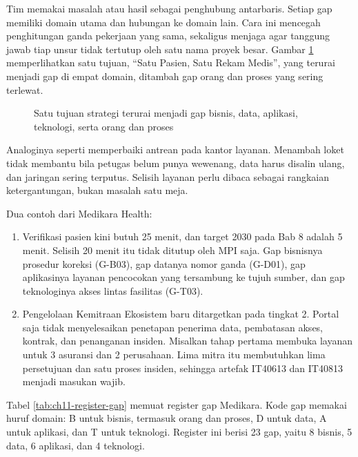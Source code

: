 Tim memakai masalah atau hasil sebagai penghubung antarbaris. Setiap gap memiliki domain
utama dan hubungan ke domain lain. Cara ini mencegah penghitungan ganda pekerjaan yang
sama, sekaligus menjaga agar tanggung jawab tiap unsur tidak tertutup oleh satu nama
proyek besar. Gambar \ref{fig:ch11-gap-lintas-domain} memperlihatkan satu tujuan,
``Satu Pasien, Satu Rekam Medis'', yang terurai menjadi gap di empat domain, ditambah
gap orang dan proses yang sering terlewat.

\begin{figure}[!htb]
  \centering
  
  \caption{Satu tujuan strategi terurai menjadi gap bisnis, data, aplikasi, teknologi,
           serta orang dan proses}
  \label{fig:ch11-gap-lintas-domain}
\end{figure}

Analoginya seperti memperbaiki antrean pada kantor layanan. Menambah loket tidak membantu
bila petugas belum punya wewenang, data harus disalin ulang, dan jaringan sering terputus.
Selisih layanan perlu dibaca sebagai rangkaian ketergantungan, bukan masalah satu meja.

Dua contoh dari Medikara Health:
\begin{enumerate}
  \item Verifikasi pasien kini butuh 25 menit, dan target 2030 pada Bab 8 adalah 5 menit.
        Selisih 20 menit itu tidak ditutup oleh MPI saja. Gap bisnisnya prosedur koreksi
        (G-B03), gap datanya nomor ganda (G-D01), gap aplikasinya layanan pencocokan yang
        tersambung ke tujuh sumber, dan gap teknologinya akses lintas fasilitas (G-T03).
  \item Pengelolaan Kemitraan Ekosistem baru ditargetkan pada tingkat 2. Portal saja
        tidak menyelesaikan penetapan penerima data, pembatasan akses, kontrak, dan
        penanganan insiden. Misalkan tahap pertama membuka layanan untuk 3 asuransi dan
        2 perusahaan. Lima mitra itu membutuhkan lima persetujuan dan satu proses
        insiden, sehingga artefak IT40613 dan IT40813 menjadi masukan wajib.
\end{enumerate}

Tabel \ref{tab:ch11-register-gap} memuat register gap Medikara. Kode gap memakai huruf
domain: B untuk bisnis, termasuk orang dan proses, D untuk data, A untuk aplikasi, dan T
untuk teknologi. Register ini berisi 23 gap, yaitu 8 bisnis, 5 data, 6 aplikasi, dan 4
teknologi.


